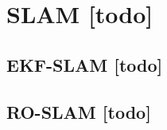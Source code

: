 \begin{comment}
------------------------------------------------------------------------------------------
Embodied Localisation and Mapping
http://elib.suub.uni-bremen.de/edocs/00103537-1.pdf

"C:\Users\Albert\Documents\Studium\Bachelor WS17\scientific publication\Efficient probabilistic range-only SLAM.ppt"


- \citez{montemerlo2002fastslam}
	- FastSLAM: A factored solution to the simultaneous localization and mapping problem

- \cite{sarkka2013bayesian}
	- Bayesian filtering and smoothing
- \cite{kurth2003experimental}
	- The Kalman Filter approach described in Section 5 can be reformulated for the SLAM problem. To perform SLAM, we include position estimates for each tag in the state, producing a state vector of the form: q(k) = [xk; yk; k; xb1; yb1 ; :::; xbn; ybn]T , where n is the number of beacons.
	
- The purpose of a probabilistic approach to RO-SLAM is to obtain the joint probability distribution of the robot pose (or path) and the map, given all the available data at some instant of time. This distribution represents our knowledge about the robot path, the map, and all their correlations.
\end{comment}
%
%
%
\section{SLAM [todo]}



%
%
%
\subsection{EKF-SLAM [todo]}


%
%
%
\subsection{RO-SLAM [todo]}


%
%
